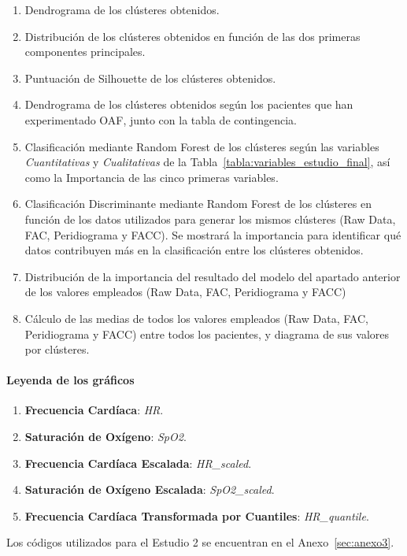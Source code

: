 \begin{enumerate}
    \item Dendrograma de los clústeres obtenidos.
    \item Distribución de los clústeres obtenidos en función de las dos primeras componentes principales.
    \item Puntuación de Silhouette de los clústeres obtenidos.
    \item Dendrograma de los clústeres obtenidos según los pacientes que han experimentado OAF, junto con la tabla de contingencia.
    \item Clasificación mediante Random Forest de los clústeres según las variables \textit{Cuantitativas} y \textit{Cualitativas} de la Tabla~\ref{tabla:variables_estudio_final}, así como la Importancia de las cinco primeras variables.
    \item Clasificación Discriminante mediante Random Forest de los clústeres en función de los datos utilizados para generar los mismos clústeres (Raw Data, FAC, Peridiograma y FACC). Se mostrará la importancia para identificar qué datos contribuyen más en la clasificación entre los clústeres obtenidos.
    \item Distribución de la importancia del resultado del modelo del apartado anterior de los valores empleados (Raw Data, FAC, Peridiograma y FACC) 
    \item Cálculo de las medias de todos los valores empleados (Raw Data, FAC, Peridiograma y FACC) entre todos los pacientes, y diagrama de sus valores por clústeres.
\end{enumerate}

\paragraph{Leyenda de los gráficos}

\begin{enumerate}
    \item \textbf{Frecuencia Cardíaca}: \textit{HR}.
    \item \textbf{Saturación de Oxígeno}: \textit{SpO2}.
    \item \textbf{Frecuencia Cardíaca Escalada}: \textit{HR\_scaled}.
    \item \textbf{Saturación de Oxígeno Escalada}: \textit{SpO2\_scaled}.
    \item \textbf{Frecuencia Cardíaca Transformada por Cuantiles}: \textit{HR\_quantile}.
\end{enumerate}

\newpage


\newpage


\newpage


\newpage


\newpage


\newpage


\vspace{10pt}
Los códigos utilizados para el Estudio 2 se encuentran en el Anexo~\ref{sec:anexo3}.
